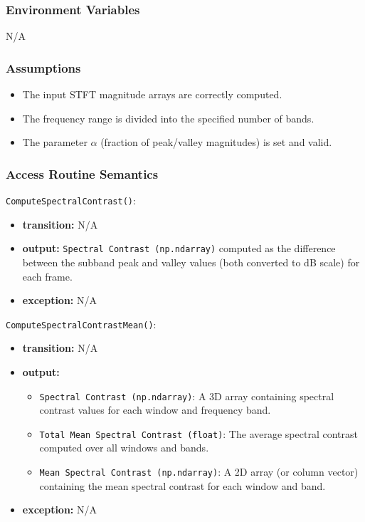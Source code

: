 \documentclass[12pt, titlepage]{article}
\begin{document}
{\subsubsection{Environment Variables}
N/A

\subsubsection{Assumptions}
\begin{itemize}
    \item The input STFT magnitude arrays are correctly computed.
    \item The frequency range is divided into the specified number of bands.
    \item The parameter \(\alpha\) (fraction of peak/valley magnitudes) is set and valid.
\end{itemize}

\subsubsection{Access Routine Semantics}

\noindent \texttt{ComputeSpectralContrast()}:
\begin{itemize}
    \item \textbf{transition:} N/A
    \item \textbf{output:} \texttt{Spectral Contrast (np.ndarray)} computed as the difference between the subband peak and valley values (both converted to dB scale) for each frame.
    \item \textbf{exception:} N/A
\end{itemize}

\noindent \texttt{ComputeSpectralContrastMean()}:
\begin{itemize}
    \item \textbf{transition:} N/A
    \item \textbf{output:}
    \begin{itemize}
        \item \texttt{Spectral Contrast (np.ndarray)}: A 3D array containing spectral contrast values for each window and frequency band.
        \item \texttt{Total Mean Spectral Contrast (float)}: The average spectral contrast computed over all windows and bands.
        \item \texttt{Mean Spectral Contrast (np.ndarray)}: A 2D array (or column vector) containing the mean spectral contrast for each window and band.
    \end{itemize}
    \item \textbf{exception:} N/A
\end{itemize}

}
\end{document}
